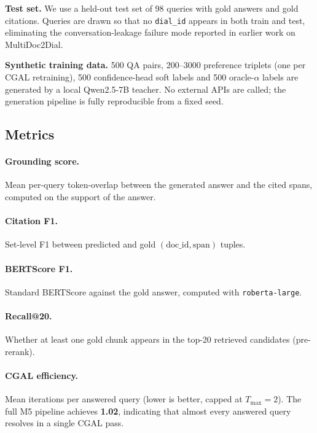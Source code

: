 \documentclass[11pt,a4paper,twocolumn]{article}
\begin{document}
\textbf{Test set.} We use a held-out test set of 98 queries with gold
answers and gold citations. Queries are drawn so that no
\texttt{dial\_id} appears in both train and test, eliminating the
conversation-leakage failure mode reported in earlier work on
MultiDoc2Dial.

\textbf{Synthetic training data.} 500 QA pairs, 200--3000 preference
triplets (one per CGAL retraining), 500 confidence-head soft labels and
500 oracle-$\alpha$ labels are generated by a local Qwen2.5\mbox{-}7B teacher.
No external APIs are called; the generation pipeline is fully
reproducible from a fixed seed.

\subsection{Metrics}

\paragraph{Grounding score.} Mean per-query token-overlap between the
generated answer and the cited spans, computed on the support of the
answer.

\paragraph{Citation F1.} Set-level F1 between predicted and gold
$(\text{doc\_id}, \text{span})$ tuples.

\paragraph{BERTScore F1.} Standard
BERTScore against the gold answer, computed with
\texttt{roberta-large}.

\paragraph{Recall@20.} Whether at least one gold chunk appears in the
top-20 retrieved candidates (pre-rerank).

\paragraph{CGAL efficiency.} Mean iterations per answered query (lower
is better, capped at $T_{\max}=2$). The full M5 pipeline achieves
\textbf{1.02}, indicating that almost every answered query resolves in a
single CGAL pass.
\end{document}
